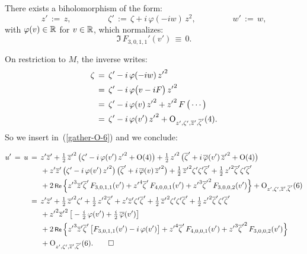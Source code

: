\documentclass[12pt,twoside,leqno,openany]{amsart}
\begin{document}
\begin{Lemma}
There exists a biholomorphism of the form:
\[
z'
\,:=\,
z,
\ \ \ \ \ \ \ \ \ \ \ \ \ \ \ \ \ \ \ \
\zeta'
\,:=\,
\zeta
+
i\,\varphi(-iw)\,z^2,
\ \ \ \ \ \ \ \ \ \ \ \ \ \ \ \ \ \ \ \
w'
\,:=\,
w,
\]
with $\varphi(v) \in \mathbb{R}$ for $v \in \mathbb{R}$, which normalizes:
\[
\Im\,
F_{3,0,1,1}'(v')
\,\equiv\,
0.
\]
\end{Lemma}

\proof
On restriction to $M$, the inverse writes:
\[
\aligned
\zeta
&
\,=\,
\zeta'
-
i\,\varphi(-iw)\,{z'}^2
\\
&
\,=\,
\zeta'
-
i\,\varphi\big(v-iF\big)\,{z'}^2
\\
&
\,=\,
\zeta'
-
i\,\varphi(v)\,{z'}^2
+
{z'}^2\,F\,\big(\cdots\big)
\\
&
\,=\,
\zeta'
-
i\,\varphi(v')\,{z'}^2
+
{\rm O}_{z',\zeta',\overline{z}',\overline{\zeta}'}(4).
\endaligned
\]
So we insert in~({\ref{gather-O-6}}) and we conclude:
\begin{footnotesize}
\begin{align*}
u'
\,=\,
u
&
\,=\,
z'\overline{z}'
+
\tfrac{1}{2}\,
{\overline{z}'}^2\,
\big(
\zeta'
-
i\,\varphi(v')\,{z'}^2
+
{\rm O}(4)
\big)
+
\tfrac{1}{2}\,
{z'}^2\,
\big(
\overline{\zeta}'
+
i\,\overline{\varphi}(v')\,{\overline{z}'}^2
+
{\rm O}(4)
\big)
\\
&
\ \ \ \ \
+
z'\overline{z}'\,
\big(
\zeta'
-
i\,\varphi(v')\,{z'}^2
\big)\,
\big(
\overline{\zeta}'
+
i\,\overline{\varphi}(v)\,
{\overline{z}'}^2
\big)
+
\tfrac{1}{2}\,
{\overline{z}'}^2\zeta'\zeta'\overline{\zeta}'
+
\tfrac{1}{2}\,{z'}^2\overline{\zeta}'\zeta'\overline{\zeta}'
\\
&
\ \ \ \ \
+
2\,\Re\,
\Big\{
{z'}^3\overline{z}'\overline{\zeta}'\,
F_{3,0,1,1}(v')
+
{z'}^4\overline{\zeta}'\,
F_{4,0,0,1}(v')
+
{z'}^3{\overline{\zeta}'}^2\,F_{3,0,0,2}(v')
\Big\}
+
{\rm O}_{z',\zeta',\overline{z}',\overline{\zeta}'}(6)
\\
&
\,=\,
z'\overline{z}'
+
\tfrac{1}{2}\,{\overline{z}'}^2\zeta'
+
\tfrac{1}{2}\,{z'}^2\overline{\zeta}'
+
z'\overline{z}'\zeta'\overline{\zeta}'
+
\tfrac{1}{2}\,{\overline{z}'}^2\zeta'\zeta'\overline{\zeta}'
+
\tfrac{1}{2}\,{z'}^2\overline{\zeta}'\zeta'\overline{\zeta}'
\\
&
\ \ \ \ \
+
{z'}^2{\overline{z}'}^2\,
\big[
-
\tfrac{i}{2}\,\varphi(v')
+
\tfrac{i}{2}\,\overline{\varphi}(v')
\big]
\\
&
\ \ \ \ \
+
2\,\Re\,
\Big\{
{z'}^3\overline{z}'\overline{\zeta}'\,
\big[
F_{3,0,1,1}(v')
-
i\,\varphi(v')
\big]
+
{z'}^4\overline{\zeta}'\,
F_{4,0,0,1}(v')
+
{z'}^3{\overline{\zeta}'}^2\,F_{3,0,0,2}(v')
\Big\}
\\
&
\ \ \ \ \ 
+
{\rm O}_{z',\zeta',\overline{z}',\overline{\zeta}'}(6).
\qedhere
\end{align*}
\end{footnotesize}
\endproof
\end{document}

